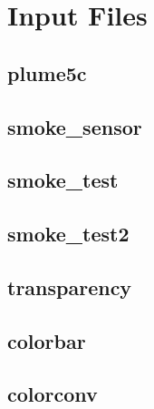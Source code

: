 \documentclass[11pt,twoside]{book}
\begin{document}




\appendix
{}

\chapter{Input Files}
\label{fdsinputfiles}

\section{plume5c}
\label{FDSplume5c}

\section{smoke\_sensor}
\label{FDSsmokesensor}

\section{smoke\_test}
\label{FDSsmoketest}

\section{smoke\_test2}
\label{FDSsmoketest2}

\section{transparency}
\label{FDStransparency}

\section{colorbar}
\label{FDScolorbar}

\section{colorconv}
\label{FDScolorconv}
\end{document}
